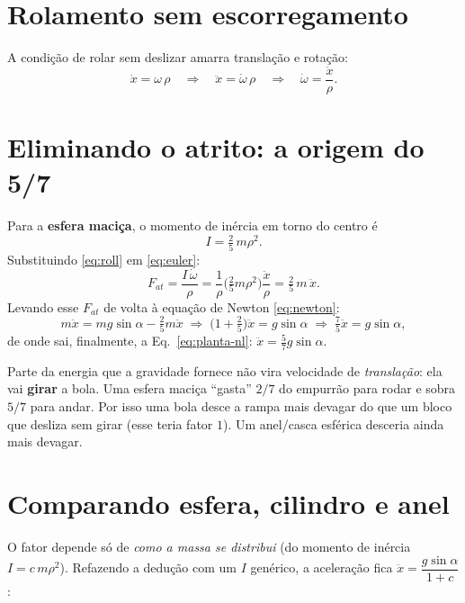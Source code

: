 \section{Rolamento sem escorregamento}
A condi\c{c}\~ao de rolar sem deslizar amarra transla\c{c}\~ao e rota\c{c}\~ao:
\begin{equation}
\dot{x} = \omega\,\rho \quad\Longrightarrow\quad \ddot{x} = \dot{\omega}\,\rho
\quad\Longrightarrow\quad \dot{\omega} = \frac{\ddot{x}}{\rho}.
\label{eq:roll}
\end{equation}

\section{Eliminando o atrito: a origem do 5/7}
Para a \textbf{esfera maci\c{c}a}, o momento de in\'ercia em torno do centro \'e
\begin{equation}
I = \tfrac{2}{5}\,m\rho^2.
\end{equation}
Substituindo \eqref{eq:roll} em \eqref{eq:euler}:
\begin{equation}
F_{at} = \frac{I\,\dot\omega}{\rho}
       = \frac{1}{\rho}\Big(\tfrac{2}{5}m\rho^2\Big)\frac{\ddot{x}}{\rho}
       = \tfrac{2}{5}\,m\,\ddot{x}.
\end{equation}
Levando esse $F_{at}$ de volta \`a equa\c{c}\~ao de Newton \eqref{eq:newton}:
\begin{equation}
m\ddot{x} = mg\sin\alpha - \tfrac{2}{5}m\ddot{x}
\;\Longrightarrow\;
\Big(1+\tfrac{2}{5}\Big)\ddot{x} = g\sin\alpha
\;\Longrightarrow\;
\tfrac{7}{5}\ddot{x} = g\sin\alpha,
\end{equation}
de onde sai, finalmente, a Eq.~\eqref{eq:planta-nl}: $\ddot{x} = \tfrac{5}{7}g\sin\alpha$.

\begin{intuicao}
Parte da energia que a gravidade fornece n\~ao vira velocidade de
\emph{transla\c{c}\~ao}: ela vai \textbf{girar} a bola. Uma esfera maci\c{c}a
``gasta'' $2/7$ do empurr\~ao para rodar e sobra $5/7$ para andar. Por isso uma
bola desce a rampa mais devagar do que um bloco que desliza sem girar (esse teria
fator $1$). Um anel/casca esf\'erica desceria ainda mais devagar.
\end{intuicao}

\section{Comparando esfera, cilindro e anel}
O fator depende s\'o de \emph{como a massa se distribui} (do momento de in\'ercia
$I=c\,m\rho^2$). Refazendo a dedu\c{c}\~ao com um $I$ gen\'erico, a acelera\c{c}\~ao
fica $\ddot x=\dfrac{g\sin\alpha}{1+c}$:

